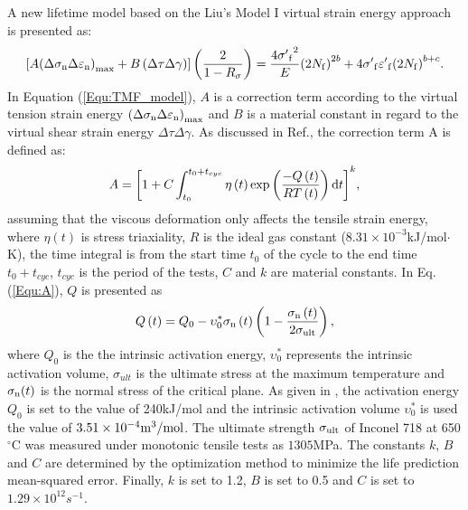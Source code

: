 A new lifetime model based on the Liu's Model I virtual strain energy approach is presented as:
\begin{equation}
\left[ {A{{\left( {\Delta {\sigma _{\rm n}}\Delta {\varepsilon _{\rm n}}} \right)}_{\max }} + B\left( {\Delta \tau \Delta \gamma } \right)} \right]\left( {\frac{2}{{1 - {R_\sigma }}}} \right)
= \frac{{4{{\sigma '}_{\rm f}}^2}}{E}{\left( {2{N_{\rm f}}} \right)^{2b}} + 4{{\sigma '}_{\rm f}}{{\varepsilon '}_{\rm f}}{\left( {2{N_{\rm f}}} \right)^{b + c}}.
\label{Equ:TMF_model}
\end{equation}
In Equation (\ref{Equ:TMF_model}), $A$ is a correction term according to the virtual tension strain energy ${{\left( {\Delta {\sigma _{\rm n}}\Delta {\varepsilon _{\rm n}}} \right)}_{\max }}$ and $B$ is a material constant in regard to the virtual shear strain energy ${\Delta \tau \Delta \gamma }$.
As discussed in Ref.\cite{Vose2013}, the correction term A is defined as:
\begin{equation}
A = {\left[ {1 + C\int_{{t_0}}^{{t_0} + {t_{cyc}}} {\eta \left( t \right)\exp \left( {\frac{{ - Q\left( t \right)}}{{RT\left( t \right)}}} \right){\rm{d}}t} } \right]^k},
\label{Equ:A}
\end{equation}
assuming that the viscous deformation only affects the tensile strain energy, where $\eta \left( t \right)$ is stress triaxiality, $R$ is the ideal gas constant ($8.31\times10^{-3}$kJ/mol$\cdot$K), the time integral is from the start time $t_0$ of the cycle to the end time $t_0 + t_{cyc}$, $t_{cyc}$ is the period of the tests, $C$ and $k$ are material constants.
In Eq. (\ref{Equ:A}), $Q$ is presented \cite{Warren2006,Warren2008} as
\begin{equation}
Q\left( t \right) = {Q_0} - \upsilon _0^*{\sigma _{\rm n}}\left( t \right)\left( {1 - \frac{{{\sigma _{\rm n}}\left( t \right)}}{{2{\sigma _{\rm{ult}}}}}} \right),
\label{Equ:creep_activation_energy}
\end{equation}
where $Q_0$ is the the intrinsic activation energy, $\upsilon _0^*$ represents the intrinsic activation volume, $\sigma_{ult}$ is the ultimate stress at the maximum temperature and $\sigma_{\rm n}(t)$ is the normal stress of the critical plane.
As given in \cite{Warren2008}, the activation energy $Q_0$ is set to the value of 240kJ/mol and the intrinsic activation volume $\upsilon _0^*$ is used the value of $3.51\times10^{-4}\rm{m}^{3}/\rm{mol}$. The ultimate strength $\sigma_{\rm{ult}}$ of Inconel 718 at 650$^\circ$C was measured under monotonic tensile tests as $1305$MPa. The constants $k$, $B$ and $C$ are determined by the optimization method to minimize the life prediction mean-squared error. Finally, $k$ is set to 1.2, $B$ is set to 0.5 and $C$ is set to $1.29\times10^{12}s^{-1}$.

